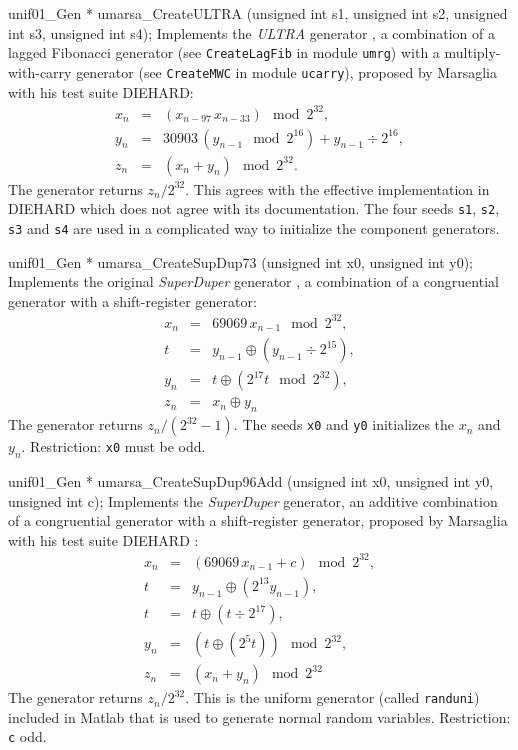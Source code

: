 unif01_Gen * umarsa_CreateULTRA (unsigned int s1, unsigned int s2,
                                 unsigned int s3, unsigned int s4);
\endcode
 \tab Implements the {\it ULTRA} generator \cite{rMAR96a}, a combination of a
   lagged Fibonacci generator (see {\tt CreateLagFib} in module  {\tt umrg})
%
   with a multiply-with-carry generator
   (see {\tt CreateMWC} in module  {\tt ucarry}),
   proposed by Marsaglia with his test suite DIEHARD:
  \begin {eqnarray*}
   x_n &=& (x_{n-97}\,x_{n-33}) \mod 2^{32}, \\
   y_{n} &=& 30903\, \left(y_{n-1} \mod 2^{16}\right) + y_{n-1}\div 2^{16}, \\
   z_n &=& (x_n + y_{n}) \mod 2^{32}.
  \end {eqnarray*}
   The generator returns $z_n/2^{32}$. This agrees with the effective
   implementation in DIEHARD which does not agree with its documentation.
   The four seeds  {\tt s1}, {\tt s2}, {\tt s3} and  {\tt s4} are used in
   a complicated way to initialize the component generators.
  \endtab
\code


unif01_Gen * umarsa_CreateSupDup73 (unsigned int x0, unsigned int y0);
\endcode
 \tab Implements the original {\it SuperDuper} generator \cite{rMAR73a}, a
\label{gen:SupDup73}%
   combination of a congruential generator with a shift-register generator:
  \begin {eqnarray*}
   x_n &=& 69069\, x_{n-1} \mod 2^{32}, \\
   t &=& y_{n-1}\oplus \left(y_{n-1} \div 2^{15}\right), \\
   y_{n} &=& t \oplus \left(2^{17} t \mod 2^{32}\right), \\
   z_n &=& x_n \oplus y_{n}
  \end {eqnarray*}
   The generator returns $z_n / (2^{32} - 1)$. The seeds {\tt x0} and
    {\tt y0} initializes the $x_n$ and $y_n$.
   Restriction: {\tt x0} must be odd.
  \endtab
\code


unif01_Gen * umarsa_CreateSupDup96Add (unsigned int x0, unsigned int y0,
                                       unsigned int c);
\endcode
 \tab Implements the {\it SuperDuper} generator, an additive  combination of a
   congruential generator with a shift-register generator, proposed by
  Marsaglia with his test suite DIEHARD \cite{rMAR96a}:
\label{gen:SupDup96}%
  \begin {eqnarray*}
   x_n &=& (69069\, x_{n-1} + c) \mod 2^{32}, \\
   t &=& y_{n-1}\oplus (2^{13}y_{n-1}), \\
   t &=& t \oplus (t \div 2^{17}), \\
   y_{n} &=& (t \oplus (2^{5}t)) \mod 2^{32}, \\
   z_n &=& (x_n  + y_n) \mod 2^{32}
  \end {eqnarray*}
   The generator returns $z_n/2^{32}$.
  This is the uniform generator  (called {\tt randuni})
  included in {\sc Matlab} that is used to %
  generate normal random variables.
   Restriction: {\tt c} odd.
  \endtab
\code


